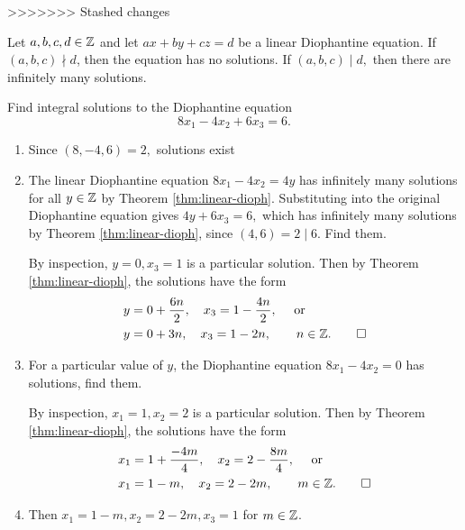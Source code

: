 \documentclass{ximera}
\begin{document}
>>>>>>> Stashed changes


\begin{proposition}\label{prop:3diophantine}
    Let $a,b,c,d\in\mathbb Z$ and let $ax+by+cz=d$ be a linear Diophantine equation. If $(a,b,c)\nmid d$, then the equation has no solutions. If $(a,b,c)\mid d,$ then there are infinitely many solutions.
\end{proposition}

\begin{br}
Find integral solutions to the Diophantine equation \[8x_1-4x_2+6x_3=6.\]

\begin{enumerate}
    \item Since $(8,-4,6)=2,$ solutions exist
    \item The linear Diophantine equation $8x_1-4x_2=4y$ has infinitely many solutions for all $y\in\mathbb Z$ by Theorem \ref{thm:linear-dioph}. Substituting into the original Diophantine equation gives $4y+6x_3=6,$ which has infinitely many solutions by Theorem \ref{thm:linear-dioph}, since $(4,6)=2\mid 6$. Find them.
     
    \begin{solution}
        By inspection, $y=0,x_3=1$ is a particular solution. Then by Theorem \ref{thm:linear-dioph}, the solutions have the form 
        \begin{align*}
            y&=0+\frac{6n}{2},\quad x_3=1-\frac{4n}{2}, \quad \textnormal{ or }\\
            y&=0+3n,\quad x_3=1-2n, \qquad n\in\mathbb Z. \qedhere
        \end{align*}
        \end{solution}
    \item  For a particular value of $y$, the Diophantine equation $8x_1-4x_2=0$ has solutions, find them. 
    \begin{solution}
        By inspection, $x_1=1,x_2=2$ is a particular solution. Then by Theorem \ref{thm:linear-dioph}, the solutions have the form 
        \begin{align*}
            x_1&=1+\frac{-4m}{4},\quad x_2=2-\frac{8m}{4}, \quad \textnormal{ or }\\
            x_1&=1-m,\quad x_2=2-2m, \qquad m\in\mathbb Z. \qedhere
        \end{align*}
        \end{solution}
    \item Then $x_1=1-m, x_2=2-2m,x_3=1$ for $m\in\mathbb Z$.
\end{enumerate}
\end{br}
\end{document}
